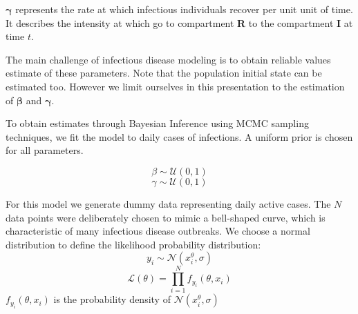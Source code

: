 \documentclass[nonatbib,preprint,12pt,authoryear]{elsarticle}
\begin{document}
$\mathbf{\gamma}$ represents the rate at which infectious individuals recover per unit unit of time. It describes the intensity at which go to compartment \textbf{R} to the compartment \textbf{I} at time $t$.

The main challenge of infectious disease modeling is to obtain reliable values estimate of these parameters. Note that the population initial state can be estimated too. 
However we limit ourselves in this presentation to the estimation of $\mathbf{\beta}$ and  $\mathbf{\gamma}$.

To obtain estimates through Bayesian Inference using MCMC sampling techniques, we fit the model to daily cases of infections. A uniform prior is chosen for all parameters.

$$\beta \sim \mathcal{U}(0,1)$$ $$\gamma \sim \mathcal{U}(0,1   )$$

For this model we generate dummy data representing daily active cases. The $N$ data points were deliberately chosen to mimic a bell-shaped curve, which is characteristic of many infectious disease outbreaks. 
We choose a normal distribution to define the likelihood probability distribution:
$$y_i \sim \mathcal{N}(x_i^\theta, \sigma)$$
$$\mathcal{L}(\theta) = \prod_{i=1}^N f_{y_i}(\theta, x_i)$$
$f_{y_i}(\theta, x_i)$ is the probability density of $\mathcal{N}(x_i^\theta, \sigma)$
\end{document}

